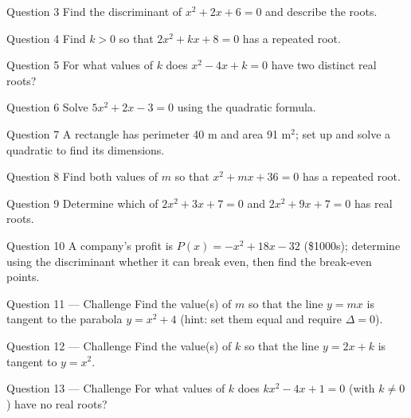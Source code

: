 \documentclass[11pt]{article}
\begin{document}
\begin{qbox}{Question 3}
Find the discriminant of $x^2+2x+6=0$ and describe the roots.\workspace{2.4cm}
\end{qbox}

\begin{qbox}{Question 4}
Find $k>0$ so that $2x^2+kx+8=0$ has a repeated root.\workspace{2.4cm}
\end{qbox}

\begin{qbox}{Question 5}
For what values of $k$ does $x^2-4x+k=0$ have two distinct real roots?\workspace{2.4cm}
\end{qbox}

\begin{qbox}{Question 6}
Solve $5x^2+2x-3=0$ using the quadratic formula.\workspace{2.4cm}
\end{qbox}

\begin{qbox}{Question 7}
A rectangle has perimeter 40 m and area 91 m$^2$; set up and solve a quadratic to find its dimensions.\workspace{2.4cm}
\end{qbox}

\begin{qbox}{Question 8}
Find both values of $m$ so that $x^2+mx+36=0$ has a repeated root.\workspace{2.4cm}
\end{qbox}

\begin{qbox}{Question 9}
Determine which of $2x^2+3x+7=0$ and $2x^2+9x+7=0$ has real roots.\workspace{2.4cm}
\end{qbox}

\begin{qbox}{Question 10}
A company's profit is $P(x)=-x^2+18x-32$ (\$1000s); determine using the discriminant whether it can break even, then find the break-even points.\workspace{2.4cm}
\end{qbox}

\begin{qbox}{Question 11 --- Challenge}
Find the value(s) of $m$ so that the line $y=mx$ is tangent to the parabola $y=x^2+4$ (hint: set them equal and require $\Delta=0$).\workspace{3.4cm}
\end{qbox}

\begin{qbox}{Question 12 --- Challenge}
Find the value(s) of $k$ so that the line $y=2x+k$ is tangent to $y=x^2$.\workspace{3.4cm}
\end{qbox}

\begin{qbox}{Question 13 --- Challenge}
For what values of $k$ does $kx^2-4x+1=0$ (with $k\neq0$) have no real roots?\workspace{3.2cm}
\end{qbox}
\end{document}
